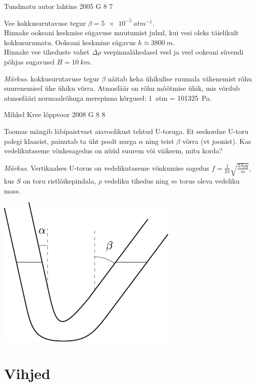 \documentclass[11pt, twoside]{article}
\begin{document}
{%
{Tundmatu autor} %
{lahtine} %
{2005} %
{G 8} %
{7} %
{
\ifStatement
Vee kokkusurutavuse tegur $\beta = \SI{5e-5}{atm^{-1}}$.\\
\osa Hinnake ookeani keskmise sügavuse muutumist juhul, kui vesi oleks täielikult kokkusurumatu. Ookeani keskmine sügavus $h \approx \SI{3800}{m}$.\\
\osa Hinnake vee tiheduste vahet $\Delta \rho$ veepinnalähedasel veel ja veel ookeani süvendi põhjas sugavusel $H = \SI{10}{km}$. 

\emph{Märkus}. kokkusurutavuse tegur $\beta$ näitab keha ühikulise ruumala vähenemist rõhu suurenemisel ühe ühiku võrra. Atmosfäär on rõhu mõõtmise ühik, mis võrdub atmosfääri normaalrõhuga merepinna kõrgusel: \SI{1}{atm} = \SI{101325}{Pa}.
\fi
}

{Mihkel Kree} %
{lõppvoor} %
{2008} %
{G 8} %
{8} %
{
\ifStatement
Toomas mängib läbipaistvast aiavoolikust tehtud U-toruga. Et seekordne U-toru polegi klaasist, painutab ta üht poolt nurga $\alpha$ ning teist $\beta$ võrra (vt joonist). Kas vedelikutaseme võnkesagedus on nüüd suurem või väiksem, mitu korda? 

\emph{Märkus}. Vertikaalses U-torus on vedelikutaseme võnkumise sagedus $f = \frac{1}{2\pi} \sqrt{\frac{2S\rho g}{m}}$, kus $S$ on toru ristlõikepindala, $\rho$ vedeliku tihedus ning $m$ torus oleva vedeliku mass.

\begin{center}
	\includegraphics[width=0.5\linewidth]{2008-v3g-08-yl}
\end{center}
\fi
}
\newpage\normalsize\section{Vihjed}
        \ToggleHint
        
}
\end{document}
